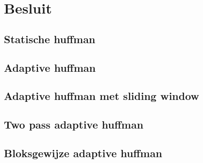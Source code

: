 \documentclass[a4paper,12pt]{report}
\begin{document}
\chapter{Besluit}
\section{Statische huffman}

\section{Adaptive huffman}


\section{Adaptive huffman met sliding window}

\section{Two pass adaptive huffman}

\section{Bloksgewijze adaptive huffman}

\end{document}
